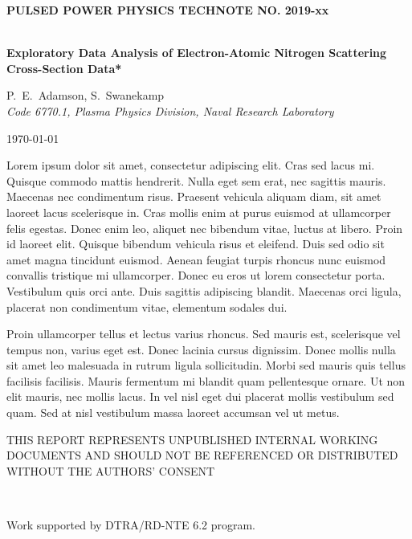 \documentclass[12pt]{article}
\begin{document}
\begin{titlepage}

\rmfamily
\begin{center}\sffamily\bfseries
PULSED POWER PHYSICS TECHNOTE NO. 2019-xx\\
{~}
\end{center}

\begin{description}[leftmargin=8em,style=nextline,font=\sffamily\bfseries ]
\item[TITLE:]{\bfseries 
Exploratory Data Analysis of Electron-Atomic Nitrogen Scattering Cross-Section Data*
}
\item[AUTHORS:]{ P.~E.~Adamson, S.~Swanekamp\\
{\itshape Code 6770.1, Plasma Physics Division, Naval Research Laboratory}}
\item[DATE:]\today
\item[ABSTRACT:] 
Lorem ipsum dolor sit amet, consectetur adipiscing elit. Cras sed lacus mi. Quisque commodo mattis hendrerit. Nulla eget sem erat, nec sagittis mauris. Maecenas nec condimentum risus. Praesent vehicula aliquam diam, sit amet laoreet lacus scelerisque in. Cras mollis enim at purus euismod at ullamcorper felis egestas. Donec enim leo, aliquet nec bibendum vitae, luctus at libero. Proin id laoreet elit. Quisque bibendum vehicula risus et eleifend. Duis sed odio sit amet magna tincidunt euismod. Aenean feugiat turpis rhoncus nunc euismod convallis tristique mi ullamcorper. Donec eu eros ut lorem consectetur porta. Vestibulum quis orci ante. Duis sagittis adipiscing blandit. Maecenas orci ligula, placerat non condimentum vitae, elementum sodales dui.

Proin ullamcorper tellus et lectus varius rhoncus. Sed mauris est, scelerisque vel tempus non, varius eget est. Donec lacinia cursus dignissim. Donec mollis nulla sit amet leo malesuada in rutrum ligula sollicitudin. Morbi sed mauris quis tellus facilisis facilisis. Mauris fermentum mi blandit quam pellentesque ornare. Ut non elit mauris, nec mollis lacus. In vel nisl eget dui placerat mollis vestibulum sed quam. Sed at nisl vestibulum massa laoreet accumsan vel ut metus.
\end{description}


\vfill

{\small
\noindent THIS REPORT REPRESENTS UNPUBLISHED INTERNAL WORKING DOCUMENTS AND SHOULD NOT BE REFERENCED OR DISTRIBUTED WITHOUT THE AUTHORS' CONSENT

{~}

\noindent * Work supported by DTRA/RD-NTE 6.2 program.
}
\end{titlepage}
\end{document}
